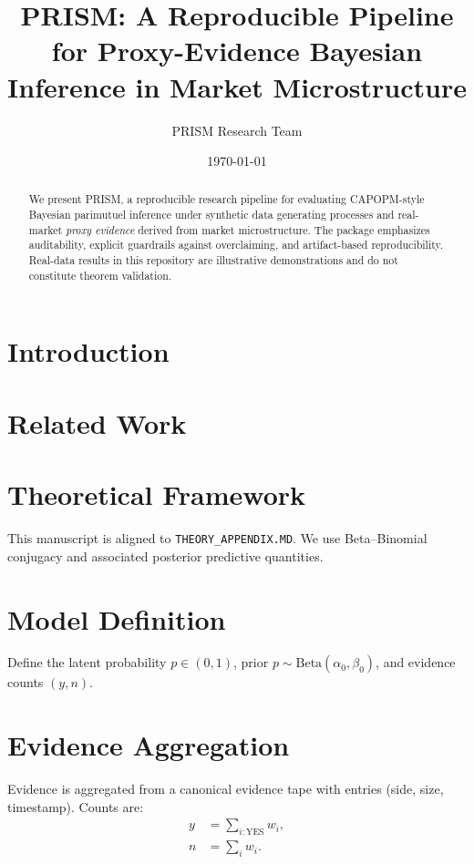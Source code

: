 \documentclass[11pt]{article}
\title{PRISM: A Reproducible Pipeline for Proxy-Evidence Bayesian Inference in Market Microstructure}
\author{PRISM Research Team}
\date{\today}
\begin{document}
\maketitle

\begin{abstract}
We present PRISM, a reproducible research pipeline for evaluating CAPOPM-style Bayesian parimutuel inference under synthetic data generating processes and real-market \emph{proxy evidence} derived from market microstructure. The package emphasizes auditability, explicit guardrails against overclaiming, and artifact-based reproducibility. Real-data results in this repository are illustrative demonstrations and do not constitute theorem validation.
\end{abstract}

\section{Introduction}

\section{Related Work}

\section{Theoretical Framework}
This manuscript is aligned to \texttt{THEORY\_APPENDIX.MD}. We use Beta--Binomial conjugacy and associated posterior predictive quantities.

\section{Model Definition}
Define the latent probability $p \in (0,1)$, prior $p \sim \mathrm{Beta}(\alpha_0,\beta_0)$, and evidence counts $(y,n)$.

\section{Evidence Aggregation}
Evidence is aggregated from a canonical evidence tape with entries (side, size, timestamp). Counts are:
\begin{align}
 y &= \sum_{i: \text{YES}} w_i,\\
 n &= \sum_i w_i.
\end{align}
\end{document}

